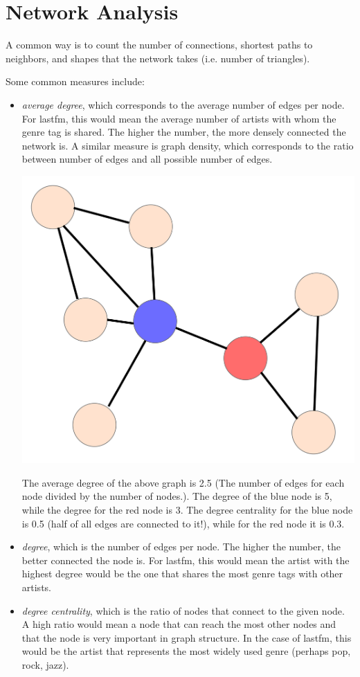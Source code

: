 \chapter{Network Analysis}

 A common way is to count the number of connections, shortest paths to neighbors, and shapes that the network takes (i.e. number of triangles).

Some common measures include:
\begin{itemize}
    \item \emph{average degree}, which corresponds to the average number of edges per node. For lastfm, this would mean the average number of artists with whom the genre tag is shared. The higher the number, the more densely connected the network is. A similar measure is graph density, which corresponds to the ratio between number of edges and all possible number of edges.
    \begin{marginfigure}
        \centering
        \includegraphics[scale=0.3]{graph.png}
        \caption{The average degree of the above graph is 2.5 (The number of edges for each node divided by the number of nodes.). The degree of the blue node is 5, while the degree for the red node is 3. The degree centrality for the blue node is 0.5 (half of all edges are connected to it!), while for the red node it is 0.3.}
    \end{marginfigure}
    \item \emph{degree}, which is the number of edges per node. The higher the number, the better connected the node is. For lastfm, this would mean the artist with the highest degree would be the one that shares the most genre tags with other artists.
    \item \emph{degree centrality}, which is the ratio of nodes that connect to the given node. A high ratio would mean a node that can reach the most other nodes and that the node is very important in graph structure. In the case of lastfm, this would be the artist that represents the most widely used genre (perhaps pop, rock, jazz).
\end{itemize}
